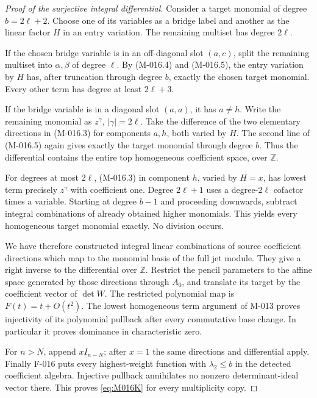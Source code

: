 \begin{proof}[Proof of the surjective integral differential]
Consider a target monomial of degree \(b=2\ell+2\).
Choose one of its variables as a bridge label and another
as the linear factor \(H\) in an entry variation.
The remaining multiset has degree \(2\ell\).

If the chosen bridge variable is in an off-diagonal slot
\((a,c)\), split the remaining multiset into \(\alpha,\beta\)
of degree \(\ell\). By (M-016.4) and (M-016.5),
the entry variation by \(H\) has, after truncation through
degree \(b\), exactly the chosen target monomial.
Every other term has degree at least \(2\ell+3\).

If the bridge variable is in a diagonal slot \((a,a)\),
it has \(a\ne h\). Write the remaining monomial as
\(z^\gamma\), \(|\gamma|=2\ell\). Take the difference
of the two elementary directions in (M-016.3) for components
\(a,h\), both varied by \(H\). The second line of
(M-016.5) again gives exactly the target monomial through
degree \(b\). Thus the differential contains the entire
top homogeneous coefficient space, over \(\mathbb Z\).

For degrees at most \(2\ell\), (M-016.3) in component
\(h\), varied by \(H=x\), has lowest term precisely
\(z^\gamma\) with coefficient one. Degree \(2\ell+1\)
uses a degree-\(2\ell\) cofactor times a variable.
Starting at degree \(b-1\) and proceeding downwards,
subtract integral combinations of already obtained higher
monomials. This yields every homogeneous target monomial
exactly. No division occurs.

We have therefore constructed integral linear combinations
of source coefficient directions which map to the monomial
basis of the full jet module. They give a right inverse to
the differential over \(\mathbb Z\). Restrict the pencil
parameters to the affine space generated by those directions
through \(A_0\), and translate its target by the coefficient
vector of \(\det W\). The restricted polynomial map is
\(F(t)=t+O(t^2)\). The lowest homogeneous term argument
of M-013 proves injectivity of its polynomial pullback after
every commutative base change. In particular it proves
dominance in characteristic zero.

For \(n>N\), append \(xI_{n-N}\); after \(x=1\)
the same directions and differential apply. Finally F-016
puts every highest-weight function with \(\lambda_2\leq b\)
in the detected coefficient algebra. Injective pullback
annihilates no nonzero determinant-ideal vector there.
This proves \eqref{eq:M016K} for every multiplicity copy.
\end{proof}

